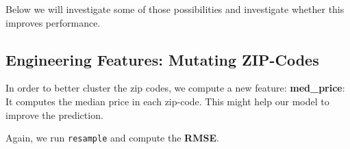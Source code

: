 \documentclass[
  11pt,
  parskip=half,
  DIV=calc,
  BCOR=10mm,
  x11names]{scrbook}
\newenvironment{Shaded}{}{}
\newcommand{\CommentTok}[1]{\textcolor[rgb]{0.00,0.50,0.00}{#1}}
\newcommand{\DataTypeTok}[1]{#1}
\newcommand{\KeywordTok}[1]{\textcolor[rgb]{0.00,0.00,1.00}{#1}}
\newcommand{\NormalTok}[1]{#1}
\newcommand{\OperatorTok}[1]{#1}
\newcommand{\StringTok}[1]{\textcolor[rgb]{0.00,0.50,0.50}{#1}}
\begin{document}
Below we will investigate some of those possibilities and investigate whether this improves performance.

\hypertarget{engineering-features-mutating-zip-codes}{%
\subsection{Engineering Features: Mutating ZIP-Codes}\label{engineering-features-mutating-zip-codes}}

In order to better cluster the zip codes, we compute a new feature: \textbf{med\_price}:
It computes the median price in each zip-code.
This might help our model to improve the prediction.

\begin{Shaded}
\end{Shaded}

Again, we run \texttt{resample} and compute the \textbf{RMSE}.
\end{document}

